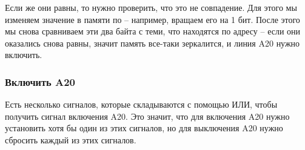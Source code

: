 \documentclass[a4page]{article}
\begin{document}
Если же они равны, то нужно проверить, что это не совпадение.
Для этого мы изменяем значение в памяти по  --
например, вращаем его на 1 бит.
После этого мы снова сравниваем эти два байта с теми, что находятся по адресу  --
если они оказались снова равны, значит память все-таки зеркалится, и линия A20 нужно включить.

\subsubsection{Включить A20}

Есть несколько сигналов, которые складываются с помощью ИЛИ, чтобы получить сигнал включения A20.
Это значит, что для включения A20 нужно установить хотя бы один из этих сигналов,
но для выключения A20 нужно сбросить каждый из этих сигналов.
\end{document}
